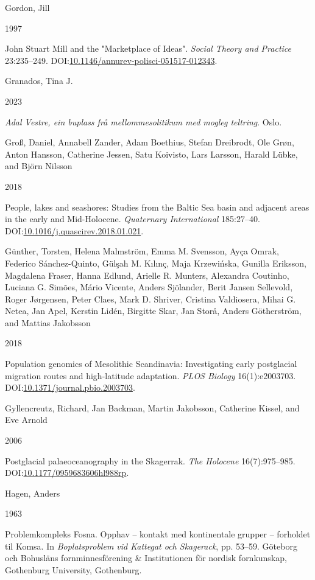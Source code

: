 \documentclass[
  a4paper,
  oneside]{uiophdthesis}
\newlength{\cslhangindent}
\newlength{\csllabelwidth}
\newlength{\cslentryspacingunit} %
\newenvironment{CSLReferences}[2] %
 {%
  \setlength{\parindent}{0pt}
  \ifodd #1
  \let\oldpar\par
  \def\par{\hangindent=\cslhangindent\oldpar}
  \fi
  \setlength{\parskip}{#2\cslentryspacingunit}
 }%
 {}
\newcommand{\CSLBlock}[1]{#1\hfill\break}
\newcommand{\CSLLeftMargin}[1]{\parbox[t]{\csllabelwidth}{#1}}
\newcommand{\CSLRightInline}[1]{\parbox[t]{\linewidth - \csllabelwidth}{#1}\break}
\begin{document}
\begin{CSLReferences}{0}{0}
\leavevmode{}%
\CSLBlock{Gordon, Jill}
\CSLLeftMargin{ 1997}
\CSLRightInline{{John Stuart Mill and the "Marketplace of Ideas"}. \emph{Social Theory and Practice} 23:235--249. DOI:\href{https://doi.org/10.1146/annurev-polisci-051517-012343}{10.1146/annurev-polisci-051517-012343}.}

\leavevmode{}%
\CSLBlock{Granados, Tina J.}
\CSLLeftMargin{ 2023}
\CSLRightInline{\emph{{Adal Vestre, ein buplass frå mellommesolitikum med mogleg teltring}}. Oslo.}

\leavevmode{}%
\CSLBlock{Groß, Daniel, Annabell Zander, Adam Boethius, Stefan Dreibrodt, Ole Grøn, Anton Hansson, Catherine Jessen, Satu Koivisto, Lars Larsson, Harald Lübke, and Björn Nilsson}
\CSLLeftMargin{ 2018}
\CSLRightInline{People, lakes and seashores: Studies from the Baltic Sea basin and adjacent areas in the early and Mid-Holocene. \emph{Quaternary International} 185:27--40. DOI:\href{https://doi.org/10.1016/j.quascirev.2018.01.021}{10.1016/j.quascirev.2018.01.021}.}

\leavevmode{}%
\CSLBlock{Günther, Torsten, Helena Malmström, Emma M. Svensson, Ayça Omrak, Federico Sánchez-Quinto, Gülşah M. Kılınç, Maja Krzewińska, Gunilla Eriksson, Magdalena Fraser, Hanna Edlund, Arielle R. Munters, Alexandra Coutinho, Luciana G. Simões, Mário Vicente, Anders Sjölander, Berit Jansen Sellevold, Roger Jørgensen, Peter Claes, Mark D. Shriver, Cristina Valdiosera, Mihai G. Netea, Jan Apel, Kerstin Lidén, Birgitte Skar, Jan Storå, Anders Götherström, and Mattias Jakobsson}
\CSLLeftMargin{ 2018}
\CSLRightInline{Population genomics of Mesolithic Scandinavia: Investigating early postglacial migration routes and high-latitude adaptation. \emph{PLOS Biology} 16(1):e2003703. DOI:\href{https://doi.org/10.1371/journal.pbio.2003703}{10.1371/journal.pbio.2003703}.}

\leavevmode{}%
\CSLBlock{Gyllencreutz, Richard, Jan Backman, Martin Jakobsson, Catherine Kissel, and Eve Arnold}
\CSLLeftMargin{ 2006}
\CSLRightInline{{Postglacial palaeoceanography in the Skagerrak}. \emph{The Holocene} 16(7):975--985. DOI:\href{https://doi.org/10.1177/0959683606hl988rp}{10.1177/0959683606hl988rp}.}

\leavevmode{}%
\CSLBlock{Hagen, Anders}
\CSLLeftMargin{ 1963}
\CSLRightInline{{Problemkompleks Fosna. Opphav -- kontakt med kontinentale grupper -- forholdet til Komsa}. In \emph{{Boplatsproblem vid Kattegat och Skagerack}}, pp. 53--59. Göteborg och Bohusläns fornminnesförening \& Institutionen för nordisk fornkunskap, Gothenburg University, Gothenburg.}


\end{CSLReferences}
\end{document}
